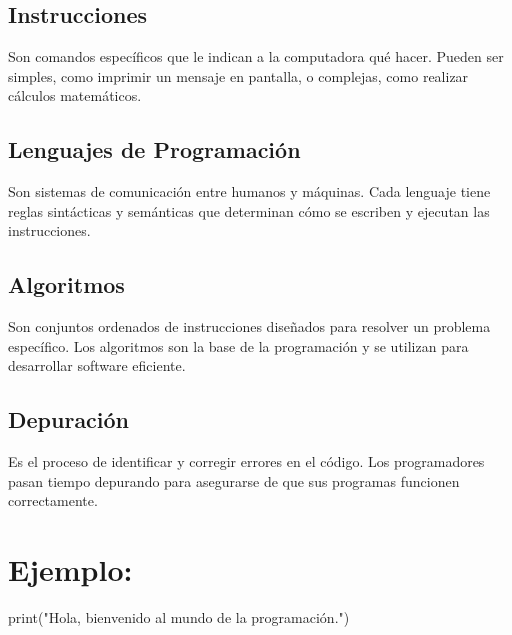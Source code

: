 \documentclass[
  a4paper,
  DIV=11,
  numbers=noendperiod,
  onepage,
  openany]{scrreprt}
\newenvironment{Shaded}{\begin{snugshade}}{\end{snugshade}}
\newcommand{\BuiltInTok}[1]{\textcolor[rgb]{0.00,0.23,0.31}{#1}}
\newcommand{\NormalTok}[1]{\textcolor[rgb]{0.00,0.23,0.31}{#1}}
\newcommand{\StringTok}[1]{\textcolor[rgb]{0.13,0.47,0.30}{#1}}
\newcommand*\circled[1]{\tikz[baseline=(char.base)]{
          \node[shape=circle,draw,inner sep=1pt] (char) {{\scriptsize#1}};}}
\begin{document}
\hypertarget{instrucciones}{%
\subsection{Instrucciones}\label{instrucciones}}

Son comandos específicos que le indican a la computadora qué hacer.
Pueden ser simples, como imprimir un mensaje en pantalla, o complejas,
como realizar cálculos matemáticos.

\hypertarget{lenguajes-de-programaciuxf3n}{%
\subsection{Lenguajes de
Programación}\label{lenguajes-de-programaciuxf3n}}

Son sistemas de comunicación entre humanos y máquinas. Cada lenguaje
tiene reglas sintácticas y semánticas que determinan cómo se escriben y
ejecutan las instrucciones.

\hypertarget{algoritmos}{%
\subsection{Algoritmos}\label{algoritmos}}

Son conjuntos ordenados de instrucciones diseñados para resolver un
problema específico. Los algoritmos son la base de la programación y se
utilizan para desarrollar software eficiente.

\hypertarget{depuraciuxf3n}{%
\subsection{Depuración}\label{depuraciuxf3n}}

Es el proceso de identificar y corregir errores en el código. Los
programadores pasan tiempo depurando para asegurarse de que sus
programas funcionen correctamente.

\hypertarget{ejemplo}{%
\section{Ejemplo:}\label{ejemplo}}

\hypertarget{annotated-cell-1}{%
\label{annotated-cell-1}}%
\begin{Shaded}
\begin{Highlighting}[]
\BuiltInTok{print}\NormalTok{(}\StringTok{"Hola, bienvenido al mundo de la programación."}\NormalTok{) }\hspace*{\fill}\NormalTok{\circled{1}}
\end{Highlighting}
\end{Shaded}
\end{document}
